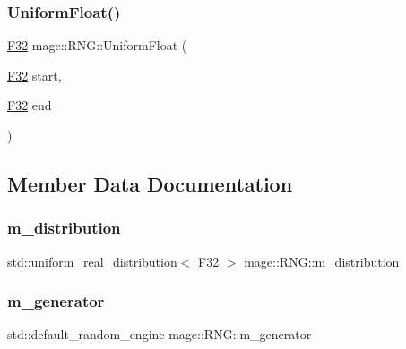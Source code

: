 \hypertarget{classmage_1_1_r_n_g_a43acf77450062519dedd3e492614317d}{}\label{classmage_1_1_r_n_g_a43acf77450062519dedd3e492614317d} 
\subsubsection{\texorpdfstring{Uniform\+Float()}{UniformFloat()}}
{\footnotesize\ttfamily \hyperlink{namespacemage_aa97e833b45f06d60a0a9c4fc22ae02c0}{F32} mage\+::\+R\+N\+G\+::\+Uniform\+Float (\begin{DoxyParamCaption}\item[{\hyperlink{namespacemage_aa97e833b45f06d60a0a9c4fc22ae02c0}{F32}}]{start,  }\item[{\hyperlink{namespacemage_aa97e833b45f06d60a0a9c4fc22ae02c0}{F32}}]{end }\end{DoxyParamCaption})\hspace{0.3cm}{\ttfamily [noexcept]}}



\subsection{Member Data Documentation}
\hypertarget{classmage_1_1_r_n_g_ac94e7e49a1751dfbfa590cd6da68b032}{}\label{classmage_1_1_r_n_g_ac94e7e49a1751dfbfa590cd6da68b032} 
\subsubsection{\texorpdfstring{m\+\_\+distribution}{m\_distribution}}
{\footnotesize\ttfamily std\+::uniform\+\_\+real\+\_\+distribution$<$ \hyperlink{namespacemage_aa97e833b45f06d60a0a9c4fc22ae02c0}{F32} $>$ mage\+::\+R\+N\+G\+::m\+\_\+distribution\hspace{0.3cm}{\ttfamily [private]}}

\hypertarget{classmage_1_1_r_n_g_a43dc452c2e32d468fa42d16e02d3a283}{}\label{classmage_1_1_r_n_g_a43dc452c2e32d468fa42d16e02d3a283} 
\subsubsection{\texorpdfstring{m\+\_\+generator}{m\_generator}}
{\footnotesize\ttfamily std\+::default\+\_\+random\+\_\+engine mage\+::\+R\+N\+G\+::m\+\_\+generator\hspace{0.3cm}{\ttfamily [private]}}

